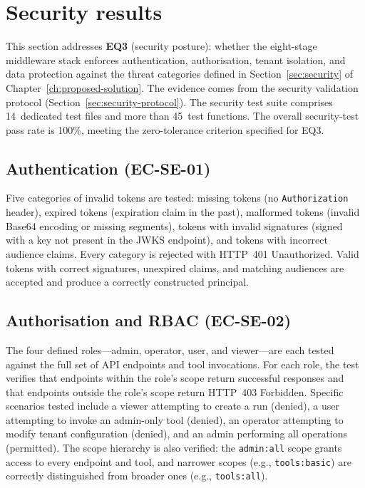 \documentclass[a4paper,noexaminfo]{sapthesis}
\begin{document}
\section{Security results}
\label{sec:security-results}

This section addresses \textbf{EQ3} (security posture): whether the
eight-stage middleware stack enforces authentication, authorisation,
tenant isolation, and data protection against the threat categories
defined in Section~\ref{sec:security} of
Chapter~\ref{ch:proposed-solution}.  The evidence comes from the
security validation protocol (Section~\ref{sec:security-protocol}).  The
security test suite comprises 14~dedicated test files and more than
45~test functions.  The overall security-test pass rate is 100\%, meeting
the zero-tolerance criterion specified for EQ3.

\subsection{Authentication (EC-SE-01)}

Five categories of invalid tokens are tested: missing tokens (no
\texttt{Authorization} header), expired tokens (expiration claim in the
past), malformed tokens (invalid Base64 encoding or missing segments),
tokens with invalid signatures (signed with a key not present in the
JWKS endpoint), and tokens with incorrect audience claims.  Every
category is rejected with HTTP~401 Unauthorized.  Valid tokens with
correct signatures, unexpired claims, and matching audiences are
accepted and produce a correctly constructed principal.

\subsection{Authorisation and RBAC (EC-SE-02)}

The four defined roles---admin, operator, user, and viewer---are each
tested against the full set of API endpoints and tool invocations.  For
each role, the test verifies that endpoints within the role's scope
return successful responses and that endpoints outside the role's scope
return HTTP~403 Forbidden.  Specific scenarios tested include a viewer
attempting to create a run (denied), a user attempting to invoke an
admin-only tool (denied), an operator attempting to modify tenant
configuration (denied), and an admin performing all operations
(permitted).  The scope hierarchy is also verified: the
\texttt{admin:all} scope grants access to every endpoint and tool, and
narrower scopes (e.g., \texttt{tools:basic}) are correctly
distinguished from broader ones (e.g., \texttt{tools:all}).
\end{document}
